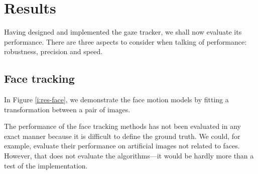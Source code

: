 \chapter{Results}
\label{s:results}
Having designed and implemented the gaze tracker, we shall now evaluate its performance.
There are three aspects to consider when talking of performance: robustness, precision and speed.

\section{Face tracking}
In Figure \ref{i:res-face}, we demonstrate the face motion models by fitting a transformation between a pair of images.

The performance of the face tracking methods has not been evaluated in any exact manner because it is difficult to define the ground truth.
We could, for example, evaluate their performance on artificial images not related to faces.
However, that does not evaluate the algorithms---it would be hardly more than a test of the implementation.

